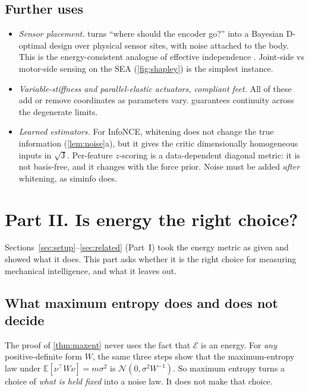 \documentclass[11pt]{article}
\theoremstyle{definition}
\theoremstyle{remark}
\newcommand{\E}{\mathbb{E}}
\newcommand{\Em}{\mathcal{E}}         %
\newcommand{\codeus}{\textunderscore\allowbreak}
\newcommand{\code}[1]{{\ttfamily\let\_\codeus\hyphenchar\font=-1 #1}}
\begin{document}
\subsection{Further uses}
\begin{itemize}
  \item \emph{Sensor placement.}  turns ``where should the encoder go?''
        into a Bayesian D-optimal design over physical sensor sites, with noise attached
        to the body. This is the energy-consistent analogue of effective independence
        \citep{kammer1991sensor,papadimitriou2004optimal}. Joint-side vs motor-side
        sensing on the SEA (\cref{fig:shapley}) is the simplest instance.
  \item \emph{Variable-stiffness and parallel-elastic actuators, compliant feet.} All of
        these add or remove coordinates as parameters vary.  guarantees
        continuity across the degenerate limits.
  \item \emph{Learned estimators.} For InfoNCE, whitening does not change the true
        information (\cref{lem:noise}a), but it gives the critic dimensionally
        homogeneous inputs in $\sqrt{\mathrm J}$. Per-feature $z$-scoring is a
        data-dependent diagonal metric: it is not basis-free, and it changes with the
        force prior. Noise must be added \emph{after} whitening, as \code{sim\_info} does.
\end{itemize}

\section{Part II. Is energy the right choice?}
\label{sec:right}

Sections~\ref{sec:setup}--\ref{sec:related} (Part~I) took the energy metric as given and showed what it does. This part asks whether it
is the right choice for measuring mechanical intelligence, and what it leaves out.

\subsection{What maximum entropy does and does not decide}

The proof of \cref{thm:maxent} never uses the fact that $\Em$ is an energy. For \emph{any}
positive-definite form $W$, the same three steps show that the maximum-entropy law under
$\E[\nu^\top W\nu]=m\sigma^2$ is $\mathcal N(0,\sigma^2W^{-1})$. So maximum entropy turns
a choice of \emph{what is held fixed} into a noise law. It does not make that choice.
\end{document}
